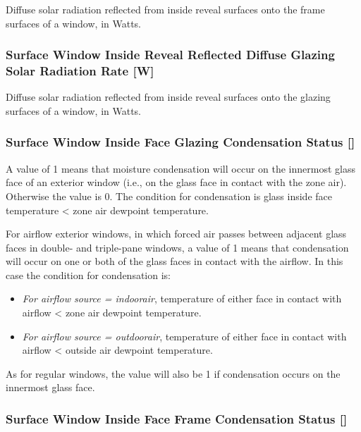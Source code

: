 Diffuse solar radiation reflected from inside reveal surfaces onto the frame surfaces of a window, in Watts.

\subsubsection{Surface Window Inside Reveal Reflected Diffuse Glazing Solar Radiation Rate {[}W{]}}\label{surface-window-inside-reveal-reflected-diffuse-glazing-solar-radiation-rate-w}

Diffuse solar radiation reflected from inside reveal surfaces onto the glazing surfaces of a window, in Watts.

\subsubsection{Surface Window Inside Face Glazing Condensation Status {[]}}\label{surface-window-inside-face-glazing-condensation-status}

A value of 1 means that moisture condensation will occur on the innermost glass face of an exterior window (i.e., on the glass face in contact with the zone air). Otherwise the value is 0. The condition for condensation is glass inside face temperature \textless{} zone air dewpoint temperature.

For airflow exterior windows, in which forced air passes between adjacent glass faces in double- and triple-pane windows, a value of 1 means that condensation will occur on one or both of the glass faces in contact with the airflow. In this case the condition for condensation is:

\begin{itemize}
\item
  \emph{For airflow source = indoorair}, temperature of either face in contact with airflow \textless{} zone air dewpoint temperature.
\item
  \emph{For airflow source = outdoorair}, temperature of either face in contact with airflow \textless{} outside air dewpoint temperature.
\end{itemize}

As for regular windows, the value will also be 1 if condensation occurs on the innermost glass face.

\subsubsection{Surface Window Inside Face Frame Condensation Status {[]}}\label{surface-window-inside-face-frame-condensation-status}

